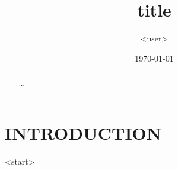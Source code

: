 \documentclass[reqno]{lanl}
\begin{document}

\title{title}
\author{<user>}
\address{CCS--2, MS D409, Los Alamos National Laboratory, Los Alamos, NM
  87544}
\email{}

\date{\today}

\begin{abstract}
...
\end{abstract}

\keywords{}
\maketitle


\section*{INTRODUCTION}

<start>




\end{document}
